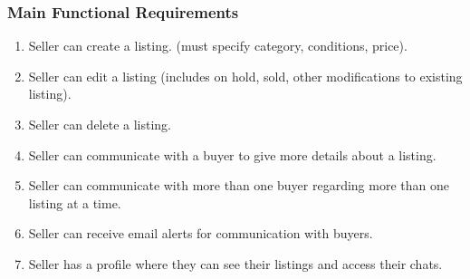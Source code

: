 \documentclass[12pt]{article}
\begin{document}
\subsubsection*{Main Functional Requirements}
\begin{enumerate}[label=\arabic*.]
    \item Seller can create a listing. (must specify category, conditions, price).
    \item Seller can edit a listing (includes on hold, sold, other modifications to existing listing).
    \item Seller can delete a listing.
    \item Seller can communicate with a buyer to give more details about a listing.
    \item Seller can communicate with more than one buyer regarding more than one listing at a time.
    \item Seller can receive email alerts for communication with buyers.
    \item Seller has a profile where they can see their listings and access their chats.
\end{enumerate}
\end{document}
